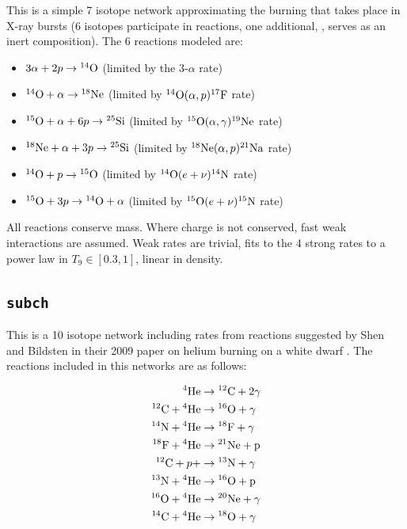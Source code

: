 This is a simple 7 isotope network approximating the burning that
takes place in X-ray bursts (6 isotopes participate in reactions, one
additional, , serves as an inert composition).  The 6 reactions
modeled are:
\begin{itemize}
\item $3\alpha + 2p \rightarrow \isotm{O}{14}$  (limited by the 3-$\alpha$ rate)

\item $\isotm{O}{14} + \alpha \rightarrow \isotm{Ne}{18}$
  (limited by $\isotm{O}{14}(\alpha,p)\isotm{F}{17}$ rate)

\item $\isotm{O}{15} + \alpha + 6 p \rightarrow \isotm{Si}{25}$
  (limited by $\isotm{O}{15}(\alpha,\gamma)\isotm{Ne}{19}$ rate)

\item $\isotm{Ne}{18} + \alpha + 3p \rightarrow \isotm{Si}{25}$
  (limited by $\isotm{Ne}{18}(\alpha,p)\isotm{Na}{21}$ rate)

\item $\isotm{O}{14} + p \rightarrow \isotm{O}{15}$
  (limited by $\isotm{O}{14}(e+\nu)\isotm{N}{14}$ rate)

\item $\isotm{O}{15} + 3p \rightarrow \isotm{O}{14} + \alpha$
  (limited by $\isotm{O}{15}(e+\nu)\isotm{N}{15}$ rate)
\end{itemize}
All reactions conserve mass.  Where charge is not conserved, fast weak
interactions are assumed.  Weak rates are trivial, fits to the 4
strong rates to a power law in $T_9 \in [0.3, 1]$, linear in density.


\subsection{{\tt subch}}
This is a 10 isotope network including rates from reactions suggested by Shen and Bildsten in their 2009 paper on helium burning on a white dwarf \cite{ShenBildsten}. 
The reactions included in this networks are as follows:

\begin{align}
	\isotm{He}{4} &\rightarrow  \isotm{C}{12} + 2\gamma \\
	\isotm{C}{12} + \isotm{He}{4} &\rightarrow \isotm{O}{16} + \gamma \\
	\isotm{N}{14} + \isotm{He}{4} &\rightarrow \isotm{F}{18} + \gamma \label{chemeq:1.1} \\
	\isotm{F}{18} + \isotm{He}{4} &\rightarrow \isotm{Ne}{21} +  \text{p} \label{chemeq:1.2} \\
	\isotm{C}{12} + p+ &\rightarrow \isotm{N}{13} + \gamma  \label{chemeq:2.1} \\
	\isotm{N}{13} + \isotm{He}{4} &\rightarrow \isotm{O}{16} + \text{p} \label{chemeq:2.2} \\
	\isotm{O}{16} + \isotm{He}{4} &\rightarrow \isotm{Ne}{20} + \gamma \\
	\isotm{C}{14} + \isotm{He}{4} &\rightarrow \isotm{O}{18} + \gamma \label{chemeq:3.2}
\end{align}

